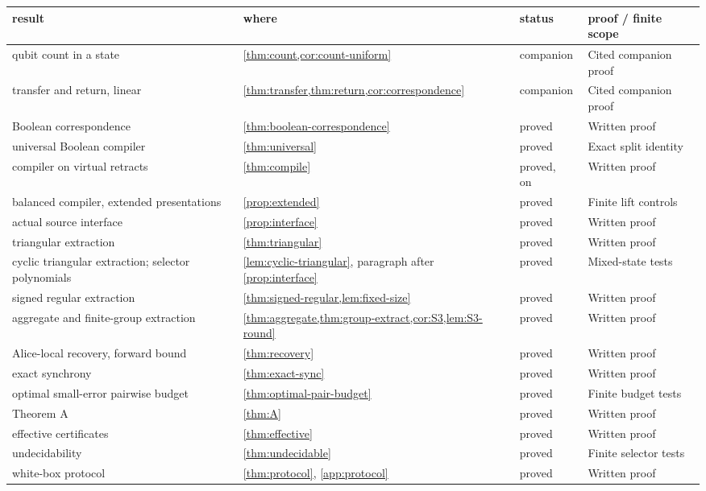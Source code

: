 \begin{longtable}{@{}L{0.3\textwidth}L{0.2\textwidth}L{0.18\textwidth}L{0.22\textwidth}@{}}
\toprule
result & where & status & proof / finite scope\\
\midrule
\endhead
qubit count in a state & \cref{thm:count,cor:count-uniform} & companion & Cited companion proof\\
transfer and return, linear & \cref{thm:transfer,thm:return,cor:correspondence} & companion & Cited companion proof\\
Boolean correspondence & \cref{thm:boolean-correspondence} & proved & Written proof\\
universal Boolean compiler & \cref{thm:universal} & proved & Exact split identity\\
compiler on virtual retracts & \cref{thm:compile} & proved, on~\cite[Lemma~B.1]{DM-game} & Written proof\\
balanced compiler, extended presentations & \cref{prop:extended} & proved & Finite lift controls\\
actual source interface & \cref{prop:interface} & proved & Written proof\\
triangular extraction & \cref{thm:triangular} & proved & Written proof\\
cyclic triangular extraction; selector polynomials & \cref{lem:cyclic-triangular}, paragraph after \cref{prop:interface} & proved & Mixed-state tests\\
signed regular extraction & \cref{thm:signed-regular,lem:fixed-size} & proved & Written proof\\
aggregate and finite-group extraction & \cref{thm:aggregate,thm:group-extract,cor:S3,lem:S3-round} & proved & Written proof\\
Alice-local recovery, forward bound & \cref{thm:recovery} & proved & Written proof\\
exact synchrony & \cref{thm:exact-sync} & proved & Written proof\\
optimal small-error pairwise budget & \cref{thm:optimal-pair-budget} & proved & Finite budget tests\\
Theorem A & \cref{thm:A} & proved & Written proof\\
effective certificates & \cref{thm:effective} & proved & Written proof\\
undecidability & \cref{thm:undecidable} & proved & Finite selector tests\\
white-box protocol & \cref{thm:protocol}, \cref{app:protocol} & proved & Written proof\\

\end{longtable}
